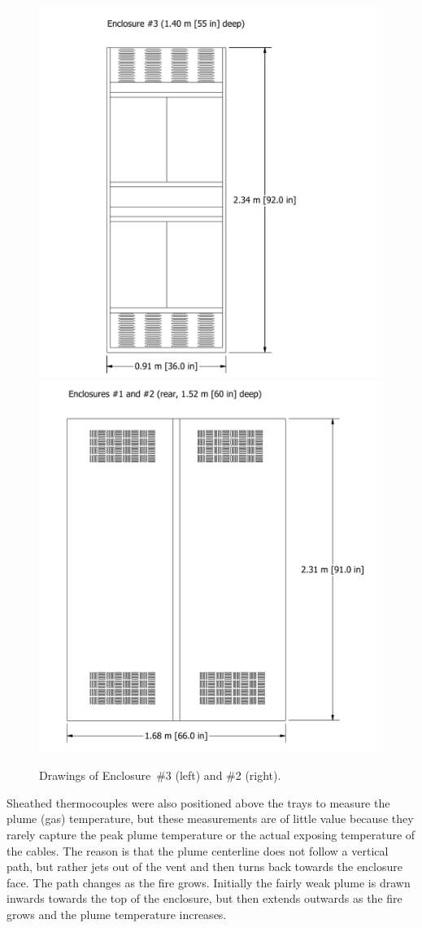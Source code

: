\begin{figure}[!ht]
\hspace*{-0.75in}\includegraphics[height=4.75in]{../FIGURES/Cabinet_3}
\hspace*{-1.25in}\includegraphics[height=4.75in]{../FIGURES/Cabinet_1}
\caption[Drawings of Enclosures \#2 and \#3]{Drawings of Enclosure~\#3 (left) and \#2 (right).}
\label{fig:enclosure_drawings}
\end{figure}
Sheathed thermocouples were also positioned above the trays to measure the plume (gas) temperature, but these measurements are of little value because they rarely capture the peak plume temperature or the actual exposing temperature of the cables. The reason is that the plume centerline does not follow a vertical path, but rather jets out of the vent and then turns back towards the enclosure face. The path changes as the fire grows. Initially the fairly weak plume is drawn inwards towards the top of the enclosure, but then extends outwards as the fire grows and the plume temperature increases.

